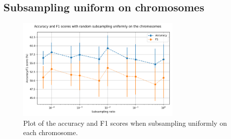 \subsection{Subsampling uniform on chromosomes}
\begin{figure}[ht]
    \begin{center}
\includegraphics[width=8cm]{figures/uniform_sample_low_ratio.png}
% 
    \end{center}
\caption{Plot of the accuracy and F1 scores when subsampling uniformly on each chromosome.}
\label{fig:res2}
\end{figure}

